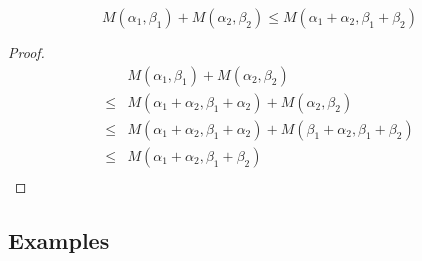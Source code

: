 \documentclass{workingnote}
\begin{document}
\begin{lemma}
  \label{lem:meas-tensor-pair}
  \begin{displaymath}
    M(\alpha_1,\beta_1) + M(\alpha_2,\beta_2) \leq M(\alpha_1+\alpha_2,\beta_1+\beta_2)
  \end{displaymath}
\end{lemma}
\begin{proof}
  \begin{displaymath}
    \begin{array}{cl}
      &M(\alpha_1,\beta_1) + M(\alpha_2,\beta_2) \\
      \leq&M(\alpha_1 + \alpha_2, \beta_1 + \alpha_2) + M(\alpha_2,\beta_2) \\
      \leq&M(\alpha_1 + \alpha_2, \beta_1 + \alpha_2) + M(\beta_1 + \alpha_2,\beta_1+\beta_2) \\
      \leq&M(\alpha_1 + \alpha_2, \beta_1+\beta_2) \\
    \end{array}
  \end{displaymath}
\end{proof}

\subsection{Examples}
\end{document}
